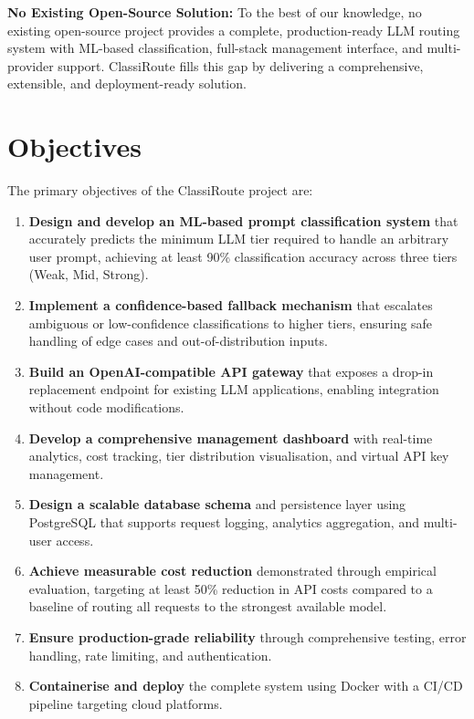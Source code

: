\documentclass[oneside,12pt,a4paper]{report}
\begin{document}
\textbf{No Existing Open-Source Solution:} To the best of our knowledge, no existing open-source project provides a complete, production-ready LLM routing system with ML-based classification, full-stack management interface, and multi-provider support. ClassiRoute fills this gap by delivering a comprehensive, extensible, and deployment-ready solution.

\section{Objectives}

The primary objectives of the ClassiRoute project are:

\begin{enumerate}
  \item \textbf{Design and develop an ML-based prompt classification system} that accurately predicts the minimum LLM tier required to handle an arbitrary user prompt, achieving at least 90\% classification accuracy across three tiers (Weak, Mid, Strong).
  \item \textbf{Implement a confidence-based fallback mechanism} that escalates ambiguous or low-confidence classifications to higher tiers, ensuring safe handling of edge cases and out-of-distribution inputs.
  \item \textbf{Build an OpenAI-compatible API gateway} that exposes a drop-in replacement endpoint for existing LLM applications, enabling integration without code modifications.
  \item \textbf{Develop a comprehensive management dashboard} with real-time analytics, cost tracking, tier distribution visualisation, and virtual API key management.
  \item \textbf{Design a scalable database schema} and persistence layer using PostgreSQL that supports request logging, analytics aggregation, and multi-user access.
  \item \textbf{Achieve measurable cost reduction} demonstrated through empirical evaluation, targeting at least 50\% reduction in API costs compared to a baseline of routing all requests to the strongest available model.
  \item \textbf{Ensure production-grade reliability} through comprehensive testing, error handling, rate limiting, and authentication.
  \item \textbf{Containerise and deploy} the complete system using Docker with a CI/CD pipeline targeting cloud platforms.
\end{enumerate}
\end{document}
